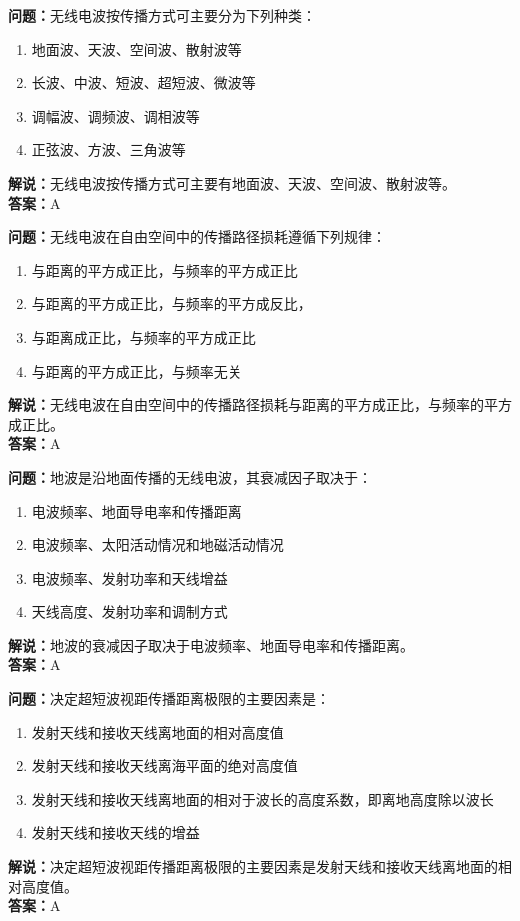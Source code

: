 \documentclass[UTF8]{ctexbook}
\begin{document}
\textbf{问题：}无线电波按传播方式可主要分为下列种类：
\begin{enumerate}[label=\Alph*), leftmargin=3em]
  \item 地面波、天波、空间波、散射波等
  \item 长波、中波、短波、超短波、微波等
  \item 调幅波、调频波、调相波等
  \item 正弦波、方波、三角波等
\end{enumerate}
\textbf{解说：}无线电波按传播方式可主要有地面波、天波、空间波、散射波等。\\
\textbf{答案：}A

\textbf{问题：}无线电波在自由空间中的传播路径损耗遵循下列规律：
\begin{enumerate}[label=\Alph*), leftmargin=3em]
  \item 与距离的平方成正比，与频率的平方成正比
  \item 与距离的平方成正比，与频率的平方成反比，
  \item 与距离成正比，与频率的平方成正比
  \item 与距离的平方成正比，与频率无关
\end{enumerate}
\textbf{解说：}无线电波在自由空间中的传播路径损耗与距离的平方成正比，与频率的平方成正比。\\
\textbf{答案：}A

\textbf{问题：}地波是沿地面传播的无线电波，其衰减因子取决于：
\begin{enumerate}[label=\Alph*), leftmargin=3em]
  \item 电波频率、地面导电率和传播距离
  \item 电波频率、太阳活动情况和地磁活动情况
  \item 电波频率、发射功率和天线增益
  \item 天线高度、发射功率和调制方式
\end{enumerate}
\textbf{解说：}地波的衰减因子取决于电波频率、地面导电率和传播距离。\\
\textbf{答案：}A

\textbf{问题：}决定超短波视距传播距离极限的主要因素是：
\begin{enumerate}[label=\Alph*), leftmargin=3em]
  \item 发射天线和接收天线离地面的相对高度值
  \item 发射天线和接收天线离海平面的绝对高度值
  \item 发射天线和接收天线离地面的相对于波长的高度系数，即离地高度除以波长
  \item 发射天线和接收天线的增益
\end{enumerate}
\textbf{解说：}决定超短波视距传播距离极限的主要因素是发射天线和接收天线离地面的相对高度值。\\
\textbf{答案：}A
\end{document}
